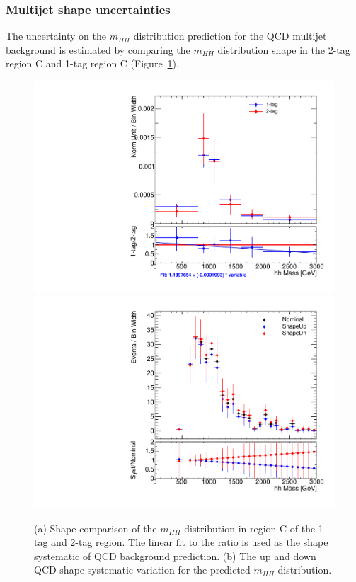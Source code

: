 %
%
\subsubsection{Multijet shape uncertainties}
\label{sec:boosted_bkgd_qcdmultijet_shape_unc}
 
The uncertainty on the $m_{HH}$ distribution prediction for the QCD multijet background is estimated by comparing
the $m_{HH}$ distribution shape in the 2-tag region C and 1-tag region C (Figure~\ref{fig:boosted_abcd_shapesyst}).
 
\begin{figure}[!h]
\begin{center}
\includegraphics[scale=0.33]{./figures/boosted/ABCD/QCD_SR_hhMass.pdf}
\includegraphics[scale=0.33]{./figures/boosted/ABCD/Fit_QCD_SR_hhMass.pdf}
\caption[Shape comparison of the $m_{HH}$ distribution in region C of the 1-tag and 2-tag region]{(a) Shape comparison of the $m_{HH}$ distribution in region C of the 1-tag and 2-tag region.
The linear fit to the ratio is used as the shape systematic of QCD background prediction.
(b) The up and down QCD shape systematic variation for the predicted $m_{HH}$ distribution.}
\label{fig:boosted_abcd_shapesyst}
\end{center}
\end{figure}

